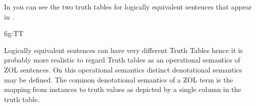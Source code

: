   
  In  you can see the two truth tables for logically equivalent sentences that appear in .
  
  
 
  {fig:TT}
 
 
Logically equivalent sentences can have very different Truth Tables hence 
it is probably more realistic to regard Truth tables as an operational semantics of ZOL sentences. On this operational semantics distinct denotational semantics may be defined. The common denotational semantics of a ZOL term is the mapping from instances to truth values as depicted by a single column  in the truth table.
 
